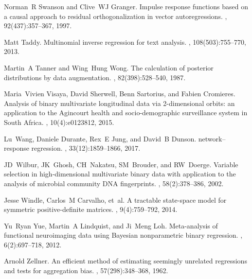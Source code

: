 \documentclass[12pt,a4paper]{article}
\theoremstyle{custom}
\begin{document}
\begin{thebibliography}{10}
Norman~R Swanson and Clive~WJ Granger.
\newblock Impulse response functions based on a causal approach to residual
  orthogonalization in vector autoregressions.
,
  92(437):357--367, 1997.

Matt Taddy.
\newblock Multinomial inverse regression for text analysis.
,
  108(503):755--770, 2013.

Martin~A Tanner and Wing~Hung Wong.
\newblock The calculation of posterior distributions by data augmentation.
,
  82(398):528--540, 1987.

Maria~Vivien Visaya, David Sherwell, Benn Sartorius, and Fabien Cromieres.
\newblock Analysis of binary multivariate longitudinal data via 2-dimensional
  orbits: an application to the {Agincourt} health and socio-demographic
  surveillance system in {South Africa}.
, 10(4):e0123812, 2015.

Lu~Wang, Daniele Durante, Rex~E Jung, and David~B Dunson.
 network--response regression.
, 33(12):1859--1866, 2017.

JD~Wilbur, JK~Ghosh, CH~Nakatsu, SM~Brouder, and RW~Doerge.
\newblock Variable selection in high-dimensional multivariate binary data with
  application to the analysis of microbial community {DNA} fingerprints.
, 58(2):378--386, 2002.

Jesse Windle, Carlos~M Carvalho, et~al.
\newblock A tractable state-space model for symmetric positive-definite
  matrices.
, 9(4):759--792, 2014.

Yu~Ryan Yue, Martin~A Lindquist, and Ji~Meng Loh.
\newblock Meta-analysis of functional neuroimaging data using {Bayesian}
  nonparametric binary regression.
, 6(2):697--718, 2012.

Arnold Zellner.
\newblock An efficient method of estimating seemingly unrelated regressions and
  tests for aggregation bias.
,
  57(298):348--368, 1962.

\end{thebibliography}
\end{document}
